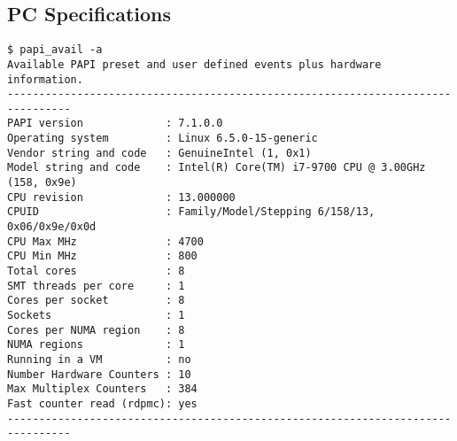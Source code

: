 \subsection{PC Specifications} \label{section:appendix:pc_specs}

\begin{verbatim}
$ papi_avail -a
Available PAPI preset and user defined events plus hardware information.
--------------------------------------------------------------------------------
PAPI version             : 7.1.0.0
Operating system         : Linux 6.5.0-15-generic
Vendor string and code   : GenuineIntel (1, 0x1)
Model string and code    : Intel(R) Core(TM) i7-9700 CPU @ 3.00GHz (158, 0x9e)
CPU revision             : 13.000000
CPUID                    : Family/Model/Stepping 6/158/13, 0x06/0x9e/0x0d
CPU Max MHz              : 4700
CPU Min MHz              : 800
Total cores              : 8
SMT threads per core     : 1
Cores per socket         : 8
Sockets                  : 1
Cores per NUMA region    : 8
NUMA regions             : 1
Running in a VM          : no
Number Hardware Counters : 10
Max Multiplex Counters   : 384
Fast counter read (rdpmc): yes
--------------------------------------------------------------------------------


\end{verbatim}
